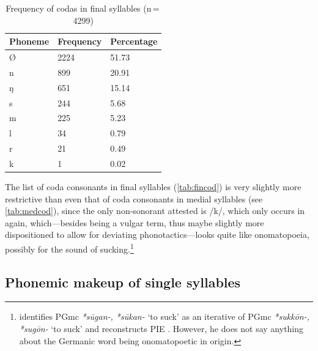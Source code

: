 \begin{table}[pth]\centering
\caption[Frequency of codas in final syllables]{Frequency of codas in final 
syllables (n\,=\,4299)}
\begin{tabu} to 0.67\linewidth{X X[c] X[c]}
\tableheaderfont\toprule
Phoneme
	& Frequency
	& Percentage
	\\
	
\toprule

Ø
	& 2224
	& 51.73\pct
	\\

\midrule

n
	& 899
	& 20.91\pct
	\\

ŋ
	& 651
	& 15.14\pct
	\\

s
	& 244
	& 5.68\pct
	\\

m
	& 225
	& 5.23\pct
	\\

l
	& 34
	& 0.79\pct
	\\

r
	& 21
	& 0.49\pct
	\\

k
	& 1
	& 0.02\pct
	\\

\bottomrule
\end{tabu}
\label{tab:fincod}
\end{table}

The list of coda consonants in final syllables (\autoref{tab:fincod}) is very 
slightly more restrictive than even that of coda consonants in medial syllables
(see \autoref{tab:medcod}), since the only non-sonorant attested is /k/, which 
only occurs in  again, which---besides being a 
vulgar term, thus maybe slightly more dispositioned to allow for deviating 
phonotactics---looks quite like onomatopoeia, possibly for the sound of 
sucking.\footnote{\citet[489--490]{kroonen2013} identifies PGmc \textit{*sūgan-,
*sūkan-} `to suck' as an iterative of PGmc \textit{*sukkōn-, *sugōn-} `to suck' 
and reconstructs PIE . However, he does not say 
anything about the Germanic word being onomatopoetic in origin.}
%

\subsection{Phonemic makeup of single syllables}

